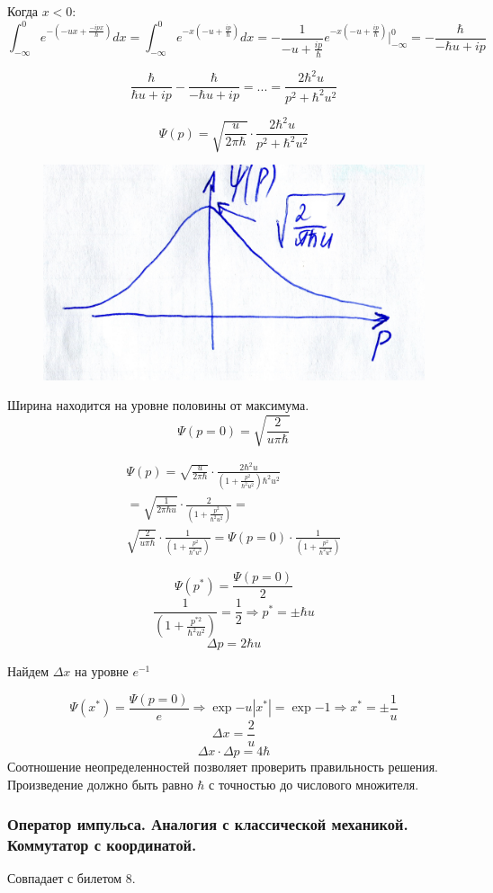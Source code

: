 Когда $x<0$:
$$\int_{-\infty}^{0} e^{-(-ux+\frac{-ipx}{\hbar})}dx=\int_{-\infty}^{0} e^{-x(-u+\frac{ip}{\hbar})}dx=-\frac{1}{-u+\frac{ip}{\hbar}}e^{-x(-u+\frac{ip}{\hbar})} \bigg|_{-\infty}^0=-\frac{\hbar}{-\hbar u+ip}$$

$$\frac{\hbar}{\hbar u+ip}-\frac{\hbar}{-\hbar u+ip}=...=\frac{2\hbar ^2u}{p^2+\hbar ^2u^2}$$


$$\Psi(p)=\sqrt{\frac{u}{2\pi \hbar}} \cdot \frac{2\hbar ^2u}{p^2+\hbar ^2u^2}$$

\begin{figure}
\includegraphics[width=\linewidth]{fig/fig731}
\caption{}
\vspace{-17pt}
\end{figure}

 Ширина находится на уровне половины от максимума.
 $$\Psi(p=0)=\sqrt{\frac{2}{u\pi \hbar}}$$

 \begin{gather*}
 \Psi(p)=\sqrt{\frac{u}{2\pi \hbar}} \cdot
 \frac{2\hbar ^2u}{(1+\frac{p^2}{\hbar ^2u^2})\hbar ^2u^2}\\
 =\sqrt{\frac{1}{2\pi \hbar u}} \cdot \frac{2}{(1+\frac{p^2}{\hbar ^2u^2})}=\\\sqrt{\frac{2}{u\pi \hbar}} \cdot \frac{1}{(1+\frac{p^2}{\hbar ^2u^2})}=\Psi(p=0)\cdot \frac{1}{(1+\frac{p^2}{\hbar ^2u^2})} 
 \end{gather*}

 $$\Psi(p^*)=\frac{\Psi(p=0)}{2}$$
 $$\frac{1}{(1+\frac{p^{*2}}{\hbar ^2u^2})}=\frac12 \Longrightarrow p^*=\pm \hbar u $$ 
 $$\Delta p=2\hbar u$$

Найдем $\Delta x$ на уровне $e^{-1}$

$$\Psi(x^*)=\frac{\Psi(p=0)}{e} \Longrightarrow \exp{-u|x^*|}=\exp{-1} \Longrightarrow x^*=\pm \frac{1}{u}$$
 $$\Delta x=\frac{2}{u}$$
 $$\Delta x \cdot \Delta p= 4\hbar$$
 Соотношение неопределенностей позволяет проверить правильность решения. Произведение должно быть равно $\hbar$ с точностью до числового множителя.

\subsubsection{ {Оператор импульса. Аналогия с классической механикой. Коммутатор с
координатой.} }

Совпадает с билетом 8.